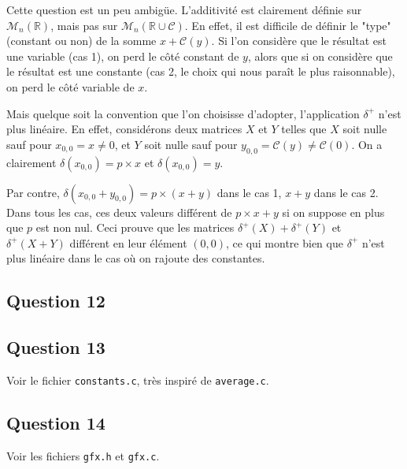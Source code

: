 \documentclass{article}
\begin{document}
Cette question est un peu ambigüe. L'additivité est clairement définie sur $\mathcal{M}_n(\mathbb{R})$, mais pas sur $\mathcal{M}_n(\mathbb{R} \cup \mathcal{C})$. En effet, il est difficile de définir le "type" (constant ou non) de la somme $x + \mathcal{C}(y)$. Si l'on considère que le résultat est une variable (cas 1), on perd le côté constant de $y$, alors que si on considère que le résultat est une constante (cas 2, le choix qui nous paraît le plus raisonnable), on perd le côté variable de $x$.

Mais quelque soit la convention que l'on choisisse d'adopter, l'application $\delta^+$ n'est plus linéaire. En effet, considérons deux matrices $X$ et $Y$ telles que $X$ soit nulle sauf pour $x_{0,0} = x \neq 0$, et $Y$ soit nulle sauf pour $y_{0,0} = \mathcal{C}(y) \neq \mathcal{C}(0)$.
On a clairement $\delta(x_{0,0}) = p \times x$ et $\delta(x_{0,0}) = y$.

Par contre, $\delta(x_{0,0} + y_{0,0}) = p \times (x+y)$ dans le cas 1, $x+y$ dans le cas 2. Dans tous les cas, ces deux valeurs différent de $p \times x + y$ si on suppose en plus que $p$ est non nul. Ceci prouve que les matrices $\delta^+(X) + \delta^+(Y)$ et $\delta^+(X+Y)$ différent en leur élément $(0,0)$, ce qui montre bien que $\delta^+$ n'est plus linéaire dans le cas où on rajoute des constantes.

\subsection*{Question 12}


\subsection*{Question 13}

Voir le fichier \texttt{constants.c}, très inspiré de \texttt{average.c}.

\subsection*{Question 14}

Voir les fichiers \texttt{gfx.h} et \texttt{gfx.c}.
\end{document}
